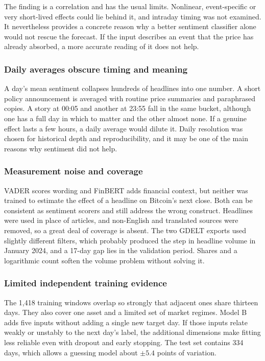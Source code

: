 The finding is a correlation and has the usual limits. Nonlinear, event-specific or very short-lived effects could lie behind it, and intraday timing was not examined. It nevertheless provides a concrete reason why a better sentiment classifier alone would not rescue the forecast. If the input describes an event that the price has already absorbed, a more accurate reading of it does not help.

\subsubsection{Daily averages obscure timing and meaning}
A day's mean sentiment collapses hundreds of headlines into one number. A short policy announcement is averaged with routine price summaries and paraphrased copies. A story at 00:05 and another at 23:55 fall in the same bucket, although one has a full day in which to matter and the other almost none. If a genuine effect lasts a few hours, a daily average would dilute it. Daily resolution was chosen for historical depth and reproducibility, and it may be one of the main reasons why sentiment did not help.

\subsubsection{Measurement noise and coverage}
VADER scores wording and FinBERT adds financial context, but neither was trained to estimate the effect of a headline on Bitcoin's next close. Both can be consistent as sentiment scorers and still address the wrong construct. Headlines were used in place of articles, and non-English and translated sources were removed, so a great deal of coverage is absent. The two GDELT exports used slightly different filters, which probably produced the step in headline volume in January 2024, and a 17-day gap lies in the validation period. Shares and a logarithmic count soften the volume problem without solving it.

\subsubsection{Limited independent training evidence}
The 1,418 training windows overlap so strongly that adjacent ones share thirteen days. They also cover one asset and a limited set of market regimes. Model B adds five inputs without adding a single new target day. If those inputs relate weakly or unstably to the next day's label, the additional dimensions make fitting less reliable even with dropout and early stopping. The test set contains 334 days, which allows a guessing model about $\pm5.4$ points of variation.

